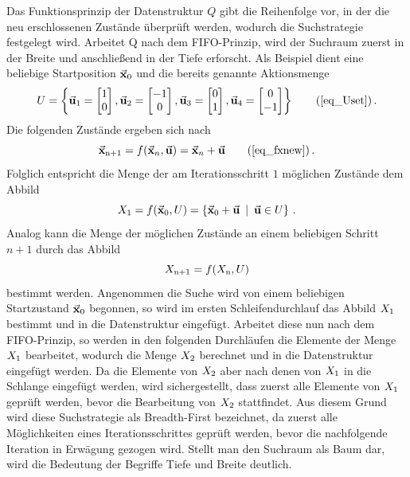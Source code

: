 Das Funktionsprinzip der Datenstruktur $Q$ gibt die Reihenfolge vor, in der die neu erschlossenen Zustände überprüft werden, wodurch die Suchstrategie festgelegt wird. Arbeitet Q nach dem FIFO-Prinzip, wird der Suchraum zuerst in der Breite und anschließend in der Tiefe erforscht. Als Beispiel dient eine beliebige Startposition $\vec{\mathbf{x}}_{\text{0}}$ und die bereits genannte Aktionsmenge
\begin{equation}
U = \left\{ 
\mVec{u}\idx{1} = \begin{bmatrix} 1 \\ 0 \end{bmatrix}, 
\mVec{u}\idx{2} = \begin{bmatrix} -1 \\ 0 \end{bmatrix},
\mVec{u}\idx{3} = \begin{bmatrix} 0 \\ 1 \end{bmatrix},
\mVec{u}\idx{4} = \begin{bmatrix} 0 \\ -1\end{bmatrix} \right\}\tag{\ref{eq_Uset}}\,.
\end{equation}
Die folgenden Zustände ergeben sich nach
\begin{equation}
\mVec{x}\idx{n+1} = f(\mVec{x}_n, \mVec{u}) = \mVec{x}_n + \mVec{u}\tag{\ref{eq_fxnew}}\,.
\end{equation}
Folglich entspricht die Menge der am Iterationsschritt $1$ möglichen Zustände dem Abbild
\begin{equation}
X_{\text{1}} = f(\vec{\mathbf{x}}_{\text{0}}, U) = \left\{ \vec{\mathbf{x}}_{\text{0}}+\vec{\mathbf{u}} \hspace{5pt}\vert \hspace{5pt} \vec{\mathbf{u}} \in U \right\}\,.
\end{equation}
Analog kann die Menge der möglichen Zustände an einem beliebigen Schritt $n+1$ durch das Abbild
\begin{equation}
X_{\text{n+1}} = f(X_{\text{n}}, U)
\end{equation}
bestimmt werden.
Angenommen die Suche wird von einem beliebigen Startzustand $\vec{\mathbf{x}}_{\text{0}}$ begonnen, so wird im ersten Schleifendurchlauf das Abbild $X_{\text{1}}$ bestimmt und in die Datenstruktur eingefügt. Arbeitet diese nun nach dem FIFO-Prinzip, so werden in den folgenden Durchläufen die Elemente der Menge $X_{\text{1}}$ bearbeitet, wodurch die Menge $X_{\text{2}}$ berechnet und in die Datenstruktur eingefügt werden. Da die Elemente von $X_{\text{2}}$ aber nach denen von $X_{\text{1}}$ in die Schlange eingefügt werden, wird sichergestellt, dass zuerst alle Elemente von $X_{\text{1}}$ geprüft werden, bevor die Bearbeitung von $X_{\text{2}}$ stattfindet. Aus diesem Grund wird diese Suchstrategie als Breadth-First bezeichnet, da zuerst alle Möglichkeiten eines Iterationsschrittes geprüft werden, bevor die nachfolgende Iteration in Erwägung gezogen wird. Stellt man den Suchraum als Baum dar, wird die Bedeutung der Begriffe Tiefe und Breite deutlich.


